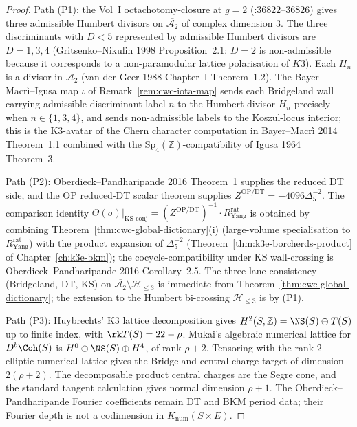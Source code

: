 \begin{proof}
Path (P1): the Vol~I octachotomy-closure at $g=2$
(\cite{VolI}:$36822$--$36826$)
gives three admissible Humbert divisors on $\overline{\mathcal A_2}$
of complex dimension $3$. The three
discriminants with $D<5$ represented by admissible Humbert divisors are
$D=1,3,4$ (Gritsenko--Nikulin 1998 Proposition~2.1: $D=2$ is
non-admissible because it corresponds to a non-paramodular lattice
polarisation of $K3$). Each $H_n$ is a divisor in
$\overline{\mathcal{A}_2}$
(van der Geer 1988 Chapter~I Theorem~1.2). The Bayer--Macr\`i--Igusa
map $\iota$ of Remark~\ref{rem:cwc-iota-map} sends each Bridgeland
wall carrying admissible discriminant label $n$ to the Humbert
divisor $H_n$ precisely when $n\in\{1,3,4\}$, and sends
non-admissible labels to the Koszul-locus interior; this is the K3-avatar of
the Chern character computation in Bayer--Macr\`i 2014 Theorem~1.1
combined with the $\mathrm{Sp}_4(\mathbb{Z})$-compatibility of
Igusa 1964 Theorem~3.

Path (P2): Oberdieck--Pandharipande 2016 Theorem~1 supplies the
reduced DT side, and the OP reduced-DT scalar theorem supplies
$Z^{\mathrm{OP/DT}}= -4096\Delta_5^{-2}$. The comparison identity
$\Theta(\sigma)|_{\mathrm{KS\text{-}conj}}=(Z^{\mathrm{OP/DT}})^{-1}\cdot
R^{\mathrm{rat}}_{\mathrm{Yang}}$ is obtained by combining
Theorem~\ref{thm:cwc-global-dictionary}(i) (large-volume specialisation
to $R^{\mathrm{rat}}_{\mathrm{Yang}}$) with the product expansion of
$\Delta_5^{-2}$ (Theorem~\ref{thm:k3e-borcherds-product} of
Chapter~\ref{ch:k3e-bkm}); the cocycle-compatibility under
KS wall-crossing is Oberdieck--Pandharipande 2016 Corollary~2.5. The
three-lane consistency (Bridgeland, DT, KS) on
$\overline{\mathcal{A}_2}\setminus\mathcal{H}_{\le 3}$ is immediate
from Theorem~\ref{thm:cwc-global-dictionary}; the extension to the
Humbert bi-crossing $\mathcal{H}_{\le 3}$ is by (P1).

Path (P3): Huybrechts' K3 lattice decomposition gives
$H^2(S,\mathbb{Z})=\NS(S)\oplus T(S)$ up to finite index, with
$\rk T(S)=22-\rho$. Mukai's algebraic numerical lattice for
$D^b\Coh(S)$ is $H^0\oplus\NS(S)\oplus H^4$, of rank $\rho+2$.
Tensoring with the rank-$2$ elliptic numerical lattice gives the
Bridgeland central-charge target of dimension $2(\rho+2)$. The
decomposable product central charges are the Segre cone, and the
standard tangent calculation gives normal dimension $\rho+1$. The
Oberdieck--Pandharipande Fourier coefficients remain DT and BKM
period data; their Fourier depth is not a codimension in
$K_{\mathrm{num}}(S\times E)$.
\end{proof}

